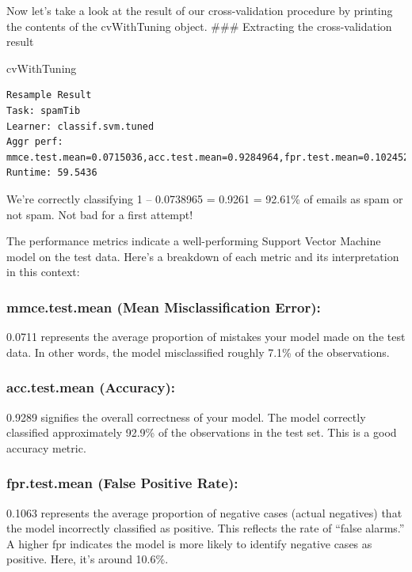 \documentclass[
]{article}
\newenvironment{Shaded}{\begin{snugshade}}{\end{snugshade}}
\newcommand{\NormalTok}[1]{#1}
\begin{document}
Now let's take a look at the result of our cross-validation procedure by
printing the contents of the cvWithTuning object. \#\#\# Extracting the
cross-validation result

\begin{Shaded}
\begin{Highlighting}[]
\NormalTok{cvWithTuning}
\end{Highlighting}
\end{Shaded}

\begin{verbatim}
Resample Result
Task: spamTib
Learner: classif.svm.tuned
Aggr perf: mmce.test.mean=0.0715036,acc.test.mean=0.9284964,fpr.test.mean=0.1024528,fnr.test.mean=0.0513175
Runtime: 59.5436
\end{verbatim}

We're correctly classifying 1 -- 0.0738965 = 0.9261 = 92.61\% of emails
as spam or not spam. Not bad for a first attempt!

The performance metrics indicate a well-performing Support Vector
Machine model on the test data. Here's a breakdown of each metric and
its interpretation in this context:

\subsubsection{mmce.test.mean (Mean Misclassification
Error):}\label{mmce.test.mean-mean-misclassification-error}

0.0711 represents the average proportion of mistakes your model made on
the test data. In other words, the model misclassified roughly 7.1\% of
the observations.

\subsubsection{acc.test.mean
(Accuracy):}\label{acc.test.mean-accuracy-1}

0.9289 signifies the overall correctness of your model. The model
correctly classified approximately 92.9\% of the observations in the
test set. This is a good accuracy metric.

\subsubsection{fpr.test.mean (False Positive
Rate):}\label{fpr.test.mean-false-positive-rate-1}

0.1063 represents the average proportion of negative cases (actual
negatives) that the model incorrectly classified as positive. This
reflects the rate of ``false alarms.'' A higher fpr indicates the model
is more likely to identify negative cases as positive. Here, it's around
10.6\%.
\end{document}
